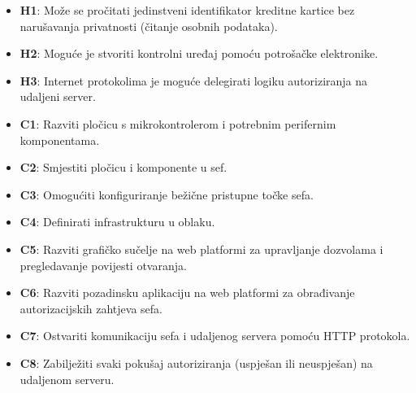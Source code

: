\begin{itemize}
    \item \textbf{H1}: Može se pročitati jedinstveni identifikator kreditne kartice bez narušavanja privatnosti (čitanje osobnih podataka).
    \item \textbf{H2}: Moguće je stvoriti kontrolni uređaj pomoću potrošačke elektronike.
    \item \textbf{H3}: Internet protokolima je moguće delegirati logiku autoriziranja na udaljeni server.

    \item \textbf{C1}: Razviti pločicu s mikrokontrolerom i potrebnim perifernim komponentama.
    \item \textbf{C2}: Smjestiti pločicu i komponente u sef.
    \item \textbf{C3}: Omogućiti konfiguriranje bežične pristupne točke sefa.
    \item \textbf{C4}: Definirati infrastrukturu u oblaku.
    \item \textbf{C5}: Razviti grafičko sučelje na web platformi za upravljanje dozvolama i pregledavanje povijesti otvaranja.
    \item \textbf{C6}: Razviti pozadinsku aplikaciju na web platformi za obrađivanje autorizacijskih zahtjeva sefa.
    \item \textbf{C7}: Ostvariti komunikaciju sefa i udaljenog servera pomoću HTTP protokola.
    \item \textbf{C8}: Zabilježiti svaki pokušaj autoriziranja (uspješan ili neuspješan) na udaljenom serveru.
\end{itemize}
